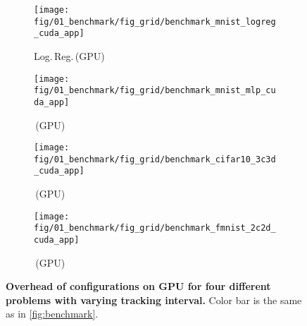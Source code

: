 \captionsetup[subfigure]{justification=justified,singlelinecheck=false}

\begin{figure}[t]
	\centering
	\begin{subfigure}[t]{0.4\textwidth}
		\caption{\mnist Log.\,Reg.\,(GPU)}
		\texttt{[image: fig/01\_benchmark/fig\_grid/benchmark\_mnist\_logreg\_cuda\_app]}
		\label{fig:app_benchmark_configurations_cuda-mnist_logreg}
	\end{subfigure}
	\hspace{0.06\textwidth}
	\begin{subfigure}[t]{0.4\textwidth}
		\caption{\mnist \mlp\,(GPU)}
		\texttt{[image: fig/01\_benchmark/fig\_grid/benchmark\_mnist\_mlp\_cuda\_app]}
		\label{fig:app_benchmark_configurations_cuda-mnist_mlp}
		\vspace{0.25cm}
	\end{subfigure}
	\begin{subfigure}[t]{0.4\textwidth}
		\caption{\cifarten \threecthreed\,(GPU)}
		\texttt{[image: fig/01\_benchmark/fig\_grid/benchmark\_cifar10\_3c3d\_cuda\_app]}
		\label{fig:app_benchmark_configurations_cuda-cifar}
	\end{subfigure}
	\hspace{0.06\textwidth}
	\begin{subfigure}[t]{0.4\textwidth}
		\caption{\fmnist \twoctwod\,(GPU)}
		\texttt{[image: fig/01\_benchmark/fig\_grid/benchmark\_fmnist\_2c2d\_cuda\_app]}
		\label{fig:app_benchmark_configurations_cuda-fmnist}
	\end{subfigure}
  \caption{\textbf{Overhead of \cockpittitle configurations on GPU for four
      different problems with varying tracking interval.} Color bar is the same as in \autoref{fig:benchmark}.}
  \label{fig:app_benchmark_configurations_cuda}
\end{figure}

\captionsetup[subfigure]{justification=centering, singlelinecheck=true}


